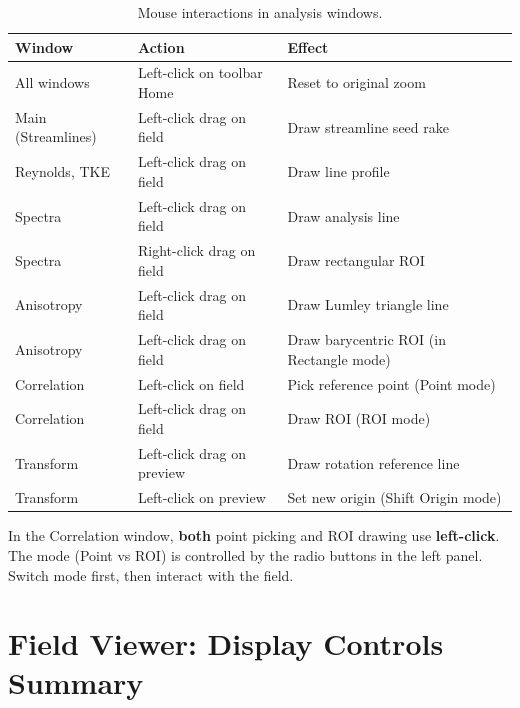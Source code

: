 \documentclass[11pt, a4paper]{report}
\begin{document}
\begin{table}[htbp]
\centering
\caption{Mouse interactions in analysis windows.}
\begin{tabular}{lp{4cm}p{6.5cm}}
\toprule
\textbf{Window} & \textbf{Action} & \textbf{Effect} \\
\midrule
All windows       & Left-click on toolbar Home & Reset to original zoom \\
Main (Streamlines) & Left-click drag on field & Draw streamline seed rake \\
Reynolds, TKE     & Left-click drag on field & Draw line profile \\
Spectra           & Left-click drag on field & Draw analysis line \\
Spectra           & Right-click drag on field & Draw rectangular ROI \\
Anisotropy        & Left-click drag on field & Draw Lumley triangle line \\
Anisotropy        & Left-click drag on field & Draw barycentric ROI (in Rectangle mode) \\
Correlation       & Left-click on field & Pick reference point (Point mode) \\
Correlation       & Left-click drag on field & Draw ROI (ROI mode) \\
Transform         & Left-click drag on preview & Draw rotation reference line \\
Transform         & Left-click on preview & Set new origin (Shift Origin mode) \\
\bottomrule
\end{tabular}
\end{table}

\begin{notebox}
In the Correlation window, \textbf{both} point picking and ROI drawing use \textbf{left-click}. The mode (Point vs ROI) is controlled by the radio buttons in the left panel. Switch mode first, then interact with the field.
\end{notebox}

\section{Field Viewer: Display Controls Summary}
\end{document}
